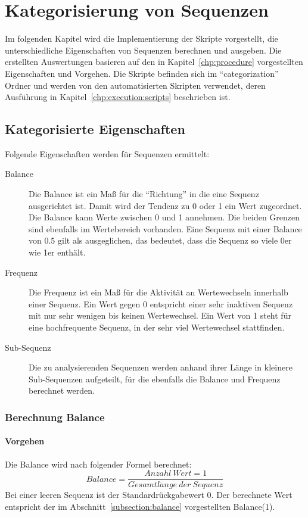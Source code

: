 \chapter{Kategorisierung von Sequenzen}
\label{chp:categorization}
Im folgenden Kapitel wird die Implementierung der Skripte vorgestellt, die unterschiedliche Eigenschaften von Sequenzen berechnen und ausgeben.
Die erstellten Auswertungen basieren auf den in Kapitel~\ref{chp:procedure} vorgestellten Eigenschaften und Vorgehen.
Die Skripte befinden sich im \enquote{categorization} Ordner und werden von den automatisierten Skripten verwendet, deren Ausführung in Kapitel~\ref{chp:execution:scripts} beschrieben ist.
\section{Kategorisierte Eigenschaften}
Folgende Eigenschaften werden für Sequenzen ermittelt:
\begin{description}
	\item[Balance] Die Balance ist ein Maß für die \enquote{Richtung} in die eine Sequenz ausgerichtet ist. Damit wird der Tendenz zu 0 oder 1 ein Wert zugeordnet. Die Balance kann Werte zwischen 0 und 1 annehmen. Die beiden Grenzen sind ebenfalls im Wertebereich vorhanden. Eine Sequenz mit einer Balance von 0.5 gilt als ausgeglichen, das bedeutet, dass die Sequenz so viele 0er wie 1er enthält.
	\item[Frequenz] Die Frequenz ist ein Maß für die Aktivität an Wertewechseln innerhalb einer Sequenz. Ein Wert gegen 0 entspricht einer sehr inaktiven Sequenz mit nur sehr wenigen bis keinen Wertewechsel. Ein Wert von 1 steht für eine hochfrequente Sequenz, in der sehr viel Wertewechsel stattfinden.
	\item[Sub-Sequenz] Die zu analysierenden Sequenzen werden anhand ihrer Länge in kleinere Sub-Sequenzen aufgeteilt, für die ebenfalls die Balance und Frequenz berechnet werden.
\end{description}

\subsection{Berechnung Balance}

\subsubsection{Vorgehen}
Die Balance wird nach folgender Formel berechnet:
\[
Balance = \frac{Anzahl\ Wert = 1}{Gesamtl\ddot{a}nge\ der\ Sequenz}
\]
Bei einer leeren Sequenz ist der Standardrückgabewert 0.
Der berechnete Wert entspricht der im Abschnitt~\ref{subsection:balance} vorgestellten Balance(1).
